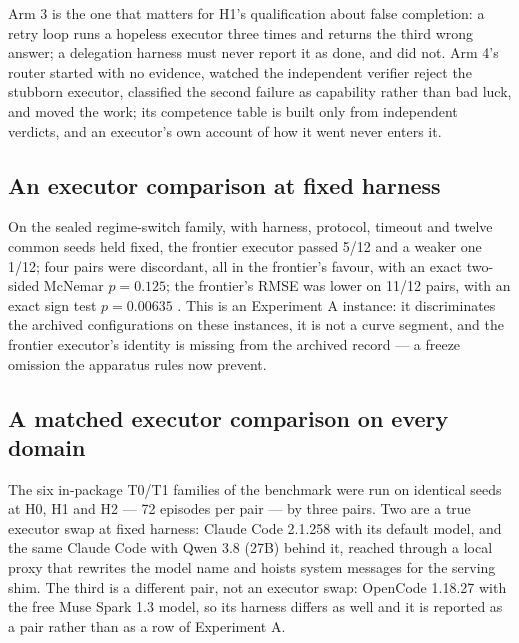 \documentclass[11pt]{article}
\theoremstyle{definition}
\begin{document}
Arm 3 is the one that matters for H1's qualification about false completion: a retry loop runs a hopeless executor three times and returns the third wrong answer; a delegation harness must never report it as done, and did not. Arm 4's router started with no evidence, watched the independent verifier reject the stubborn executor, classified the second failure as capability rather than bad luck, and moved the work; its competence table is built only from independent verdicts, and an executor's own account of how it went never enters it.

\subsection{An executor comparison at fixed harness}

On the sealed regime-switch family, with harness, protocol, timeout and twelve common seeds held fixed, the frontier executor passed 5/12 and a weaker one 1/12; four pairs were discordant, all in the frontier's favour, with an exact two-sided McNemar $p = 0.125$; the frontier's RMSE was lower on 11/12 pairs, with an exact sign test $p = 0.00635$ \citep{yang2026unified}. This is an Experiment A instance: it discriminates the archived configurations on these instances, it is not a curve segment, and the frontier executor's identity is missing from the archived record --- a freeze omission the apparatus rules now prevent.

\subsection{A matched executor comparison on every domain}\label{sec:execcmp}

The six in-package T0/T1 families of the benchmark \citep{yang2026uab} were run on identical seeds at H0, H1 and H2 --- 72 episodes per pair --- by three pairs. Two are a true executor swap at fixed harness: Claude Code 2.1.258 with its default model, and the same Claude Code with Qwen 3.8 (27B) behind it, reached through a local proxy that rewrites the model name and hoists system messages for the serving shim. The third is a different pair, not an executor swap: OpenCode 1.18.27 with the free Muse Spark 1.3 model, so its harness differs as well and it is reported as a pair rather than as a row of Experiment A.
\end{document}
